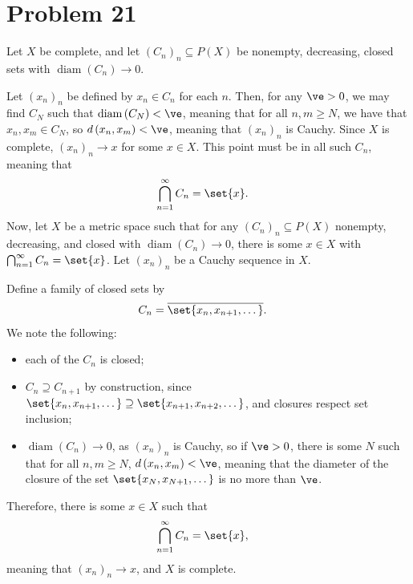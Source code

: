 \documentclass[10pt]{mypackage}
\begin{document}
\section{Problem 21}%
Let $X$ be complete, and let $\left( C_n \right)_n\subseteq P(X)$ be nonempty, decreasing, closed sets with $\operatorname{diam}\left( C_n \right)\rightarrow 0$.\newline

Let $\left( x_n \right)_n$ be defined by $x_n\in C_n$ for each $n$. Then, for any $\ve > 0$, we may find $C_N$ such that $\operatorname{diam}\left( C_N \right) < \ve$, meaning that for all $n,m\geq N$, we have that $x_n,x_m\in C_N$, so $d\left( x_n,x_m \right) < \ve$, meaning that $\left( x_n \right)_n$ is Cauchy. Since $X$ is complete, $\left( x_n \right)_n\rightarrow x$ for some $x\in X$. This point must be in all such $C_n$, meaning that
\begin{align*}
  \bigcap_{n=1}^{\infty}C_n &= \set{x}.
\end{align*}
Now, let $X$ be a metric space such that for any $\left( C_n \right)_n\subseteq P(X)$ nonempty, decreasing, and closed with $\operatorname{diam}\left( C_n \right)\rightarrow 0$, there is some $x\in X$ with $\bigcap_{n=1}^{\infty}C_n = \set{x}$. Let $\left( x_n \right)_n$ be a Cauchy sequence in $X$.\newline

Define a family of closed sets by
\begin{align*}
  C_n &= \overline{\set{x_n,x_{n+1},\dots}}.
\end{align*}
We note the following:
\begin{itemize}
  \item each of the $C_n$ is closed;
  \item $C_n \supseteq C_{n+1}$ by construction, since $\set{x_n,x_{n+1},\dots}\supseteq \set{x_{n+1},x_{n+2},\dots}$, and closures respect set inclusion;
  \item $\operatorname{diam}\left( C_n \right)\rightarrow 0$, as $\left( x_n \right)_n$ is Cauchy, so if $\ve > 0$, there is some $N$ such that for all $n,m \geq N$, $d\left( x_n,x_m \right) < \ve$, meaning that the diameter of the closure of the set $\set{x_{N},x_{N+1},\dots}$ is no more than $\ve$.
\end{itemize}
Therefore, there is some $x\in X$ such that
\begin{align*}
  \bigcap_{n=1}^{\infty}C_n &= \set{x},
\end{align*}
meaning that $\left( x_n \right)_n \rightarrow x$, and $X$ is complete.
\end{document}
